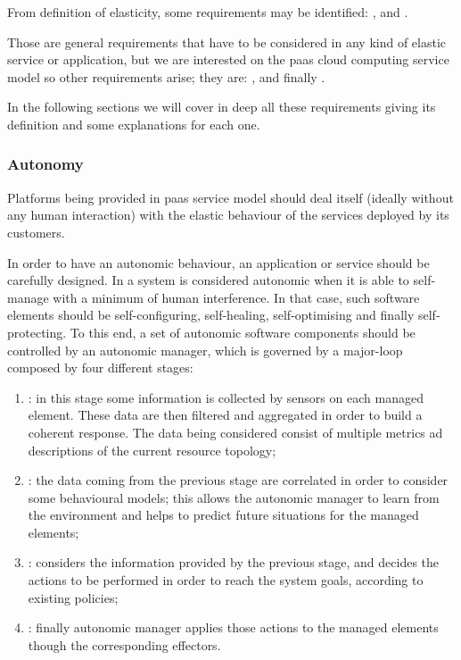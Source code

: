 From \citeauthor{herbst2013elasticity} definition of elasticity, some requirements may be
identified: ,  and .

Those are general requirements that have to be considered in any kind of elastic service or application,
but we are interested on the \ac{paas} cloud computing service model so other requirements arise;
they are: ,  and finally .

In the following sections we will cover in deep all these requirements giving its definition and
some explanations for each one.

\subsubsection*{Autonomy}
\label{sec:elasticity-requirements-autonomy}
Platforms being provided in \ac{paas} service model should deal itself (ideally without any human
interaction) with the elastic behaviour of the services deployed by its customers.

In order to have an autonomic behaviour, an application or service should be carefully designed. In 
\cite{ibm2005architectural} a system is considered autonomic when it is able to self-manage with a
minimum of human interference. In that case, such software elements should be self-configuring,
self-healing, self-optimising and finally self-protecting. To this end, a set of autonomic software
components should be controlled by an autonomic manager, which is governed by a major-loop
composed by four different stages:

\begin{enumerate}
	\item{: in this stage some information is collected by sensors on each managed
		element. These data are then filtered and aggregated in order to build a coherent response. The
		data being considered consist of multiple metrics ad descriptions of the current resource
		topology;}
	\item{: the data coming from the previous stage are correlated in order to consider
		some behavioural models; this allows the autonomic manager to learn from the environment and helps
		to predict future situations for the managed elements;}
	\item{: considers the information provided by the previous stage, and decides the
		actions to be performed in order to reach the system goals, according to existing policies;}
	\item{: finally autonomic manager applies those actions to the managed elements
		though the corresponding effectors.}
\end{enumerate}

